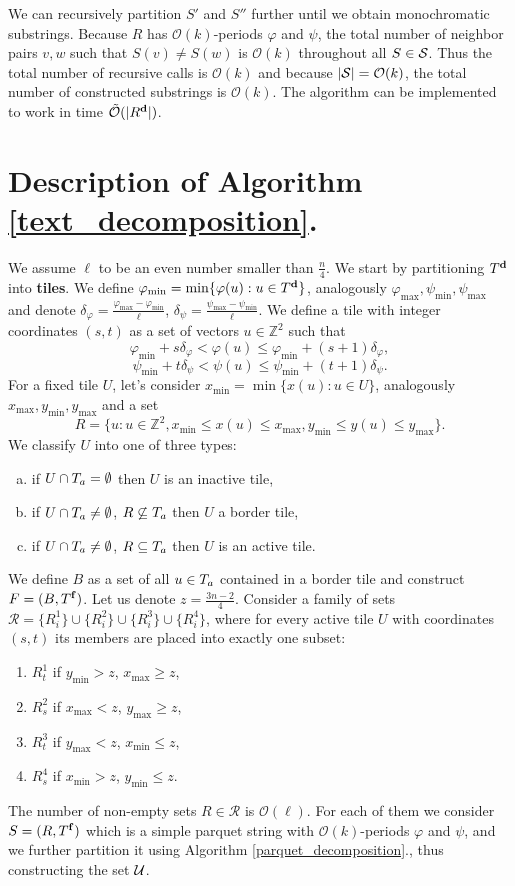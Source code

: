 \documentclass[11pt]{article}
\newcommand{\Z}{\mathbb{Z}}
\renewcommand{\O}{\mathcal{O}}
\newcommand{\tO}{\tilde{\mathcal{O}}}
\renewcommand{\phi}{\varphi}
\newcommand{\set}[1]{\lbrace #1 \rbrace}
\theoremstyle{plain}
\theoremstyle{definition}
\begin{document}
We can recursively partition $S'$ and $S''$ further until we obtain monochromatic substrings.
Because $R$ has $\O(k)$-periods $\phi$ and $\psi$, the total number of neighbor pairs $v, w$ such that $S(v) \neq S(w)$ is $\O(k)$ throughout all $S \in \S$.
Thus the total number of recursive calls is $\O(k)$ and because $|\S| = \O(k)$, the total number of constructed substrings is $\O(k)$.
The algorithm can be implemented to work in time $\tO(|\d{R}|)$.


\section{Description of Algorithm \ref{text_decomposition}.}

We assume $\ell$ to be an even number smaller than $\frac{n}{4}$. 
We start by partitioning $\d{T}$ into \textbf{tiles}.
We define $\phi_{\min} = \min \set{\phi(u) : u \in \d{T}}$, analogously $\phi_{\max}, \psi_{\min}, \psi_{\max}$ and denote $\delta_{\phi} = \frac{\phi_{\max} - \phi_{\min}}{\ell}$, $\delta_{\psi} = \frac{\psi_{\max} - \psi_{\min}}{\ell}$.
We define a tile with integer coordinates $(s, t)$ as a set of vectors $u \in \Z^2$ such that
$$ \phi_{\min} + s \delta_{\phi} < \phi(u) \le \phi_{\min} + (s + 1)\delta_{\phi}, $$ 
$$ \psi_{\min} + t \delta_{\psi} < \psi(u) \le \psi_{\min} + (t + 1)\delta_{\psi}. $$
For a fixed tile $U$, let's consider $x_{\min} = \min \set{x(u) : u \in U}$, analogously $x_{\max}, y_{\min}, y_{\max}$ and a set
$$ R = \set{u : u \in \Z^2, x_{\min} \le x(u) \le x_{\max}, y_{\min} \le y(u) \le y_{\max}}. $$
We classify $U$ into one of three types:
\begin{enumerate}[a)]
	\item if $U \cap \Ta = \emptyset$ then $U$ is an inactive tile,
	\item if $U \cap \Ta \neq \emptyset$, $R \not \subseteq \Ta$ then $U$ a border tile,
	\item if $U \cap \Ta \neq \emptyset$, $R \subseteq \Ta$ then $U$ is an active tile.
\end{enumerate}
We define $B$ as a set of all $u \in \Ta$ contained in a border tile and construct $F = (B, \f{T})$.
Let us denote $z = \frac{3n - 2}{4}$.
Consider a family of sets $\mathcal{R} = \set{R^1_i} \cup \set{R^2_i} \cup \set{R^3_i} \cup \set{R^4_i}$,
where for every active tile $U$ with coordinates $(s, t)$ its members are placed into exactly one subset:
\begin{enumerate}[1)]
	\item $R^1_{t}$ if $y_{\min} > z$, $x_{\max} \ge z$,
	\item $R^2_{s}$ if $x_{\max} < z$, $y_{\max} \ge z$,
	\item $R^3_{t}$ if $y_{\max} < z$, $x_{\min} \le z$,
	\item $R^4_{s}$ if $x_{\min} > z$, $y_{\min} \le z$.
\end{enumerate}
The number of non-empty sets $R \in \mathcal{R}$ is $\O(\ell)$.
For each of them we consider $S = (R, \f{T})$ which is a simple parquet string with $\O(k)$-periods $\phi$ and $\psi$,
and we further partition it using Algorithm \ref{parquet_decomposition}., thus constructing the set $\U$.
\end{document}
